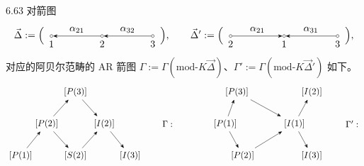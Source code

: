 \begin{example}{6.63}
对箭图
\[
\vec{\Delta}:=\Bigl(\,
\begin{tikzpicture}[baseline=-0.5ex]
  \node[draw,circle,inner sep=1pt,label=below:{$1$}] (v1) at (0,0) {};
  \node[draw,circle,inner sep=1pt,label=below:{$2$}] (v2) at (1.8,0) {};
  \node[draw,circle,inner sep=1pt,label=below:{$3$}] (v3) at (3.6,0) {};
  \draw[-{Stealth}] (v2) -- node[above]{$\alpha_{21}$} (v1);
  \draw[-{Stealth}] (v3) -- node[above]{$\alpha_{32}$} (v2);
\end{tikzpicture}
\,\Bigr),\qquad
\vec{\Delta}':=\Bigl(\,
\begin{tikzpicture}[baseline=-0.5ex]
  \node[draw,circle,inner sep=1pt,label=below:{$2$}] (w2) at (0,0) {};
  \node[draw,circle,inner sep=1pt,label=below:{$1$}] (w1) at (1.9,0) {};
  \node[draw,circle,inner sep=1pt,label=below:{$3$}] (w3) at (3.8,0) {};
  \draw[-{Stealth}] (w2) -- node[above]{$\alpha_{21}$} (w1);
  \draw[-{Stealth}] (w3) -- node[above]{$\alpha_{31}$} (w1);
\end{tikzpicture}
\,\Bigr),
\]
对应的阿贝尔范畴的 AR 箭图 $\Gamma:=\Gamma(\mathrm{mod}\text{-}K\vec{\Delta})$、$\Gamma':=\Gamma(\mathrm{mod}\text{-}K\vec{\Delta}')$ 如下。
\[\begin{tikzpicture}[baseline=-0.5ex,x=1.15cm,y=1.05cm]
  \node (P3) at (1,2.4) {$[P(3)]$};
  \node (P2) at (0,1.2) {$[P(2)]$};
  \node (I2) at (2,1.2) {$[I(2)]$};
  \node (P1) at (-0.9,0) {$[P(1)]$};
  \node (S2) at (1,0) {$[S(2)]$};
  \node (I3) at (2.9,0) {$[I(3)]$};
  \draw[-{Stealth}] (P1) -- (P2);
  \draw[-{Stealth}] (P2) -- (P3);
  \draw[-{Stealth}] (P3) -- (I2);
  \draw[-{Stealth}] (P2) -- (S2);
  \draw[-{Stealth}] (S2) -- (I2);
  \draw[-{Stealth}] (I2) -- (I3);
  \node at (4.2,1.2) {$\Gamma:$};
\end{tikzpicture}
\qquad\qquad
\begin{tikzpicture}[baseline=-0.5ex,x=1.15cm,y=1.05cm]
  \node (P3) at (0.2,2.4) {$[P(3)]$};
  \node (I2) at (2.8,2.4) {$[I(2)]$};
  \node (P1) at (-0.2,1.2) {$[P(1)]$};
  \node (I1) at (2.2,1.2) {$[I(1)]$};
  \node (P2) at (0.4,0) {$[P(2)]$};
  \node (I3) at (2.8,0) {$[I(3)]$};
  \draw[-{Stealth}] (P1) -- (P3);
  \draw[-{Stealth}] (P3) -- (I1);
  \draw[-{Stealth}] (I1) -- (I2);
  \draw[-{Stealth}] (P1) -- (P2);
  \draw[-{Stealth}] (P2) -- (I1);
  \draw[-{Stealth}] (I1) -- (I3);
  \node at (4.2,1.2) {$\Gamma':$};
\end{tikzpicture}
\]


\end{example}
